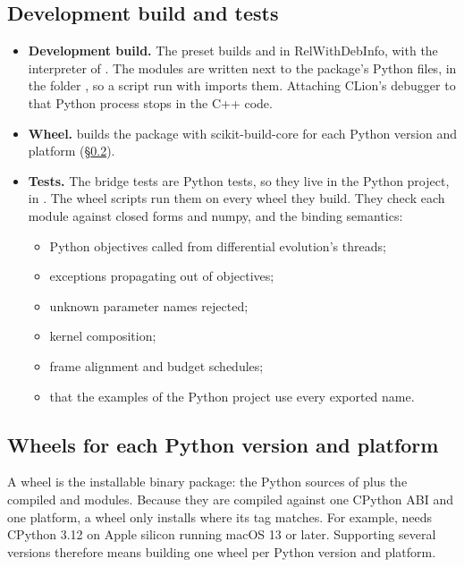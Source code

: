 \documentclass[11pt,a4paper]{article}
\begin{document}
\subsection{Development build and tests}
\begin{itemize}
  \item \textbf{Development build.} The preset  builds  and
         in RelWithDebInfo, with the interpreter of .
        The modules are written next to the package's Python files, in the folder
        , so a script run with
         imports them. Attaching CLion's debugger to that Python
        process stops in the C++ code.
  \item \textbf{Wheel.}  builds the package with scikit-build-core for each
        Python version and platform (\S\ref{sec:wheels}).
  \item \textbf{Tests.} The bridge tests are Python tests, so they live in the Python project,
        in . The wheel scripts run them on every wheel they build.
        They check each module against closed forms and numpy, and the binding semantics:
        \begin{itemize}
          \item Python objectives called from differential evolution's threads;
          \item exceptions propagating out of objectives;
          \item unknown parameter names rejected;
          \item kernel composition;
          \item frame alignment and budget schedules;
          \item that the examples of the Python project use every exported name.
        \end{itemize}
\end{itemize}

\subsection{Wheels for each Python version and platform}\label{sec:wheels}
A wheel is the installable binary package: the Python sources of 
plus the compiled  and  modules. Because they are compiled against one CPython ABI
and one platform, a wheel only installs where its tag matches. For example,
 needs CPython 3.12 on Apple silicon running macOS 13 or later.
Supporting several versions therefore means building one wheel per Python version and platform.
\end{document}
